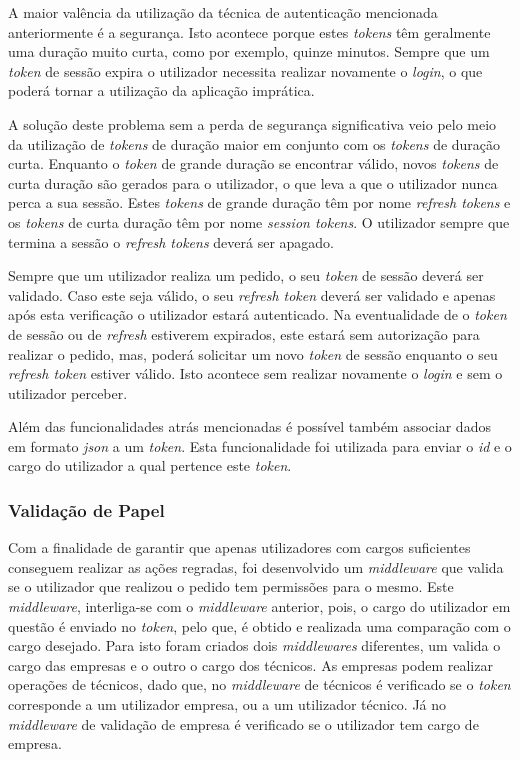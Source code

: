 A maior valência da utilização da técnica de autenticação mencionada anteriormente é a segurança. Isto acontece porque estes \textit{tokens} têm geralmente uma duração muito curta, como por exemplo, quinze minutos. Sempre que um \textit{token} de sessão expira o utilizador necessita realizar novamente o \textit{login}, o que poderá tornar a utilização da aplicação imprática.

A solução deste problema sem a perda de segurança significativa veio pelo meio da utilização de \textit{tokens} de duração maior em conjunto com os \textit{tokens} de duração curta. Enquanto o \textit{token} de grande duração se encontrar válido, novos \textit{tokens} de curta duração são gerados para o utilizador, o que leva a que o utilizador nunca perca a sua sessão. Estes \textit{tokens} de grande duração têm por nome \textit{refresh tokens} e os \textit{tokens} de curta duração têm por nome \textit{session tokens}. O utilizador sempre que termina a sessão o \textit{refresh tokens} deverá ser apagado.

Sempre que um utilizador realiza um pedido, o seu \textit{token} de sessão deverá ser validado. Caso este seja válido, o seu \textit{refresh token} deverá ser validado e apenas após esta verificação o utilizador estará autenticado. Na eventualidade de o \textit{token} de sessão ou de \textit{refresh} estiverem expirados, este estará sem autorização para realizar o pedido, mas, poderá solicitar um novo \textit{token} de sessão enquanto o seu \textit{refresh token} estiver válido. Isto acontece sem realizar novamente o \textit{login} e sem o utilizador perceber.

 Além das funcionalidades atrás mencionadas é possível também associar dados em formato \textit{json} a um \textit{token}. Esta funcionalidade foi utilizada para enviar o \textit{id} e o cargo do utilizador a qual pertence este \textit{token}.

 \newpage

\subsubsection{Validação de Papel}

Com a finalidade de garantir que apenas utilizadores com cargos suficientes conseguem realizar as ações regradas, foi desenvolvido um \textit{middleware} que valida se o utilizador que realizou o pedido tem permissões para o mesmo. Este \textit{middleware}, interliga-se com o \textit{middleware} anterior, pois, o cargo do utilizador em questão é enviado no \textit{token}, pelo que, é obtido e realizada uma comparação com o cargo desejado. Para isto foram criados dois \textit{middlewares} diferentes, um valida o cargo das empresas e o outro o cargo dos técnicos. As empresas podem realizar operações de técnicos, dado que, no \textit{middleware} de técnicos é verificado se o \textit{token} corresponde a um utilizador empresa, ou a um utilizador técnico. Já no \textit{middleware} de validação de empresa é verificado se o utilizador tem cargo de empresa.
